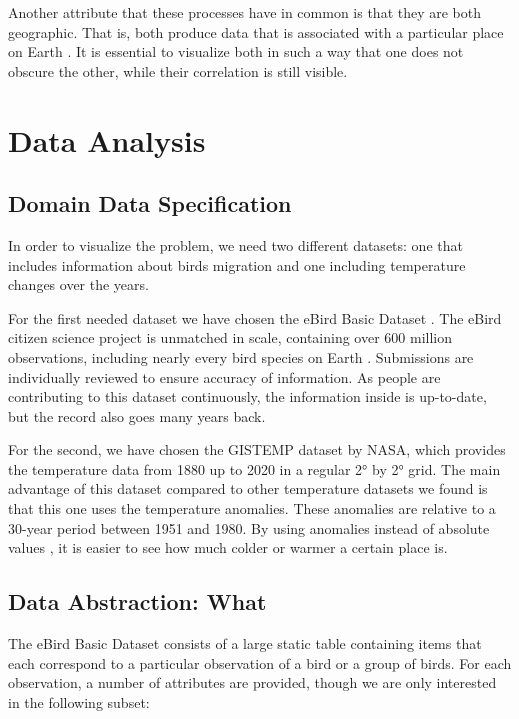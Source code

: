\documentclass[journal]{vgtc}                %
\begin{document}
Another attribute that these processes have in common is that they are both geographic. That is, both produce data that is associated with a particular place on Earth \cite{iso2014geo}. It is essential to visualize both in such a way that one does not obscure the other, while their correlation is still visible.

\section{Data Analysis}

\subsection{Domain Data Specification}

In order to visualize the problem, we need two different datasets: one that includes information about birds migration and one including temperature changes over the years.

For the first needed dataset we have chosen the eBird Basic Dataset \cite{ebird2020data}. The eBird citizen science project is unmatched in scale, containing over 600 million observations, including nearly every bird species on Earth \cite{strimas2020ebird}. Submissions are individually reviewed to ensure accuracy of information. As people are contributing to this dataset continuously, the information inside is up-to-date, but the record also goes many years back.

For the second, we have chosen the GISTEMP dataset \cite{gistemp} by NASA, which provides the temperature data from 1880 up to 2020 in a regular 2° by 2° grid. The main advantage of this dataset compared to other temperature datasets we found is that this one uses the temperature anomalies. These anomalies are relative to a 30-year period between 1951 and 1980. By using anomalies instead of absolute values \cite{gistempanomalies}, it is easier to see how much colder or warmer a certain place is. 

\subsection{Data Abstraction: What}

The eBird Basic Dataset \cite{ebird2020data} consists of a large static table containing items that each correspond to a particular observation of a bird or a group of birds. For each observation, a number of attributes are provided, though we are only interested in the following subset:
\end{document}
